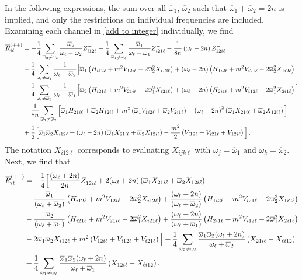 \documentclass[../PhD.tex]{subfiles}
\newcommand{\oone}{\overline{\omega}_1}
\newcommand{\otwo}{\overline{\omega}_2}
\begin{document}
In the following expressions, the sum over all $\oone$, $\otwo$ such that $\oone + \otwo = 2n$ is implied, and only the restrictions on individual frequencies are included. Examining each channel in \eqref{add to integer} individually, we find
\begin{align}
\label{R1}
\overline{R}^{(++)}_{i \ell} &= - \frac{1}{4} \sum_{\otwo \neq \ol} \frac{\otwo}{\ol - \otwo} Z^{-}_{i12\ell} - \frac{1}{4} \sum_{\oone \neq \ol} \frac{\oone}{\ol - \oone} Z^{-}_{i21\ell} - \frac{1}{8n} \left( \ol - 2n \right) Z^-_{12i\ell} \nonumber \\
%
& - \frac{1}{4} \sum_{\oi \neq \oone} \frac{1}{\ol - \otwo} \Big[ \oone \left( H_{i12\ell} + m^2 V_{12i\ell} - 2 \otwo^2 X_{i12\ell} \right) + (\ol - 2n) \left( H_{1i2\ell} + m^2 V_{i21\ell} - 2\otwo^2 X_{1i2\ell} \right)\Big] \nonumber \\
%
& - \frac{1}{4} \sum_{\oi \neq \otwo} \frac{1}{\ol - \oone} \Big[ \otwo \left( H_{i21\ell} + m^2 V_{21i\ell} - 2\oone^2 X_{i21\ell} \right) + (\ol - 2n) \left( H_{2i1\ell} + m^2 V_{i12\ell} - 2\oone^2 X_{2i1\ell} \right) \Big] \nonumber \\
%
& - \frac{1}{8n} \sum_{\oone \neq \otwo} \Big[ \oone H_{21i\ell} + \otwo H_{12i\ell} + m^2 \left( \oone V_{1i2\ell} + \otwo V_{2i1\ell} \right) - \left( \ol - 2n \right)^2 \left(\oone X_{21i\ell} + \otwo X_{12i\ell} \right) \Big] \nonumber \\
%
& + \frac{1}{2} \Big[ \oone\otwo X_{i12\ell} + \left( \ol - 2n \right)\left( \oone X_{21i\ell} + \otwo X_{12i\ell} \right) - \frac{m^2}{2} \left( V_{i12\ell} + V_{i21\ell} + V_{12i\ell} \right) \Big] \, .
\end{align}
The notation $X_{i12\ell}$ corresponds to evaluating $X_{ijk\ell}$ with $\omega_j = \oone$ and $\omega_k = \otwo$. Next, we find that
\begin{align}
\label{R2}
\overline{R}_{i \ell}^{(+-)} &= - \frac{1}{4} \Big[ \frac{(\ol + 2n)}{2n} Z^-_{12i\ell} + 2 (\ol + 2n) \left( \oone X_{21i\ell} + \otwo X_{12i\ell} \right) \nonumber \\
%
& -\frac{\oone}{(\ol + \otwo)} \left( H_{i12\ell} + m^2 V_{12i\ell} - 2 \otwo^2 X_{i12\ell} \right) + \frac{(\ol + 2n)}{(\ol + \otwo)} \left( H_{1i2\ell} + m^2 V_{i21\ell} - 2\otwo^2 X_{1i2\ell} \right)  \nonumber \\
%
&- \frac{\otwo}{(\ol + \oone)} \left( H_{i21\ell} + m^2 V_{21i\ell} - 2\oone^2 X_{i21\ell} \right) + \frac{(\ol + 2n)}{(\ol + \oone)} \left(H_{2i1\ell} + m^2 V_{i12\ell} - 2\oone^2 X_{2i1\ell} \right)  \nonumber \\
%
&  - 2 \oone\otwo X_{i12\ell} + m^2 \left( V_{12i\ell} + V_{i12\ell} + V_{i21\ell} \right) \Big] + \frac{1}{4} \sum_{\otwo \neq \ol} \frac{\oone\otwo(\ol + 2n)}{\ol + \otwo} \left( X_{21i\ell} - X_{\ell i 12} \right) \nonumber \\
%
& + \frac{1}{4} \sum_{\oone \neq \ol} \frac{\oone\otwo(\ol + 2n)}{\ol + \oone} \left( X_{12i\ell} - X_{\ell i 12} \right).
\end{align}
\end{document}
